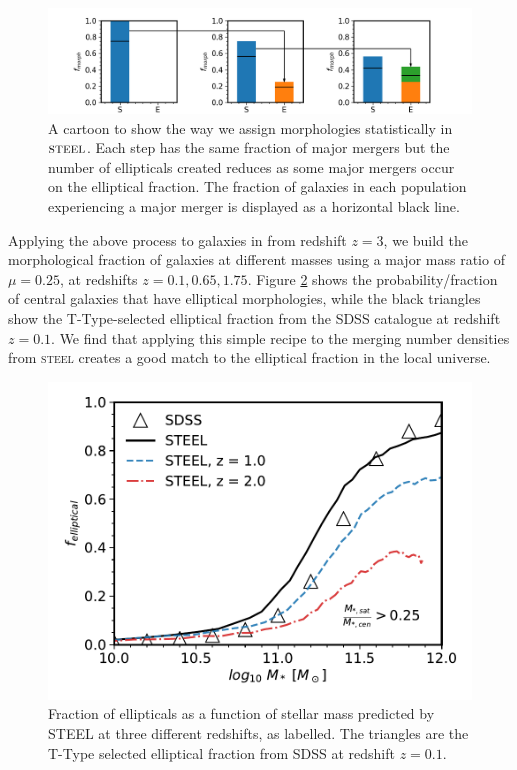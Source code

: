 \begin{figure}[h]
	\centering
	\includegraphics[width = \linewidth]{Figures/Chapter5/Morphology_Evolution.png}
	\caption{A cartoon to show the way we assign morphologies statistically in $\textsc{steel}$. Each step has the same fraction of major mergers but the number of ellipticals created reduces as some major mergers occur on the elliptical fraction. The fraction of galaxies in each population experiencing a major merger is displayed as a horizontal black line.}
	\label{fig:Gal_Morph_toon}
\end{figure}

Applying the above process to galaxies in \steel from redshift $z = 3$, we build the morphological fraction of galaxies at different masses using a major mass ratio of $\mu = 0.25$, at redshifts $z = 0.1, 0.65, 1.75$. Figure \ref{fig:Gal_Morph} shows the probability/fraction of central galaxies that have elliptical morphologies, while the black triangles show the T-Type-selected elliptical fraction from the SDSS catalogue at redshift $z = 0.1$. We find that applying this simple recipe to the merging number densities from \textsc{steel} creates a good match to the elliptical fraction in the local universe.

\begin{figure}[h]
	\centering
	\includegraphics[width = \linewidth]{Figures/Chapter5/GalaxyMorphologies.pdf}
	\caption{Fraction of ellipticals as a function of stellar mass predicted by STEEL at three different redshifts, as labelled. The triangles are the T-Type selected elliptical fraction from SDSS at redshift $z = 0.1$.}
	\label{fig:Gal_Morph}
\end{figure}


